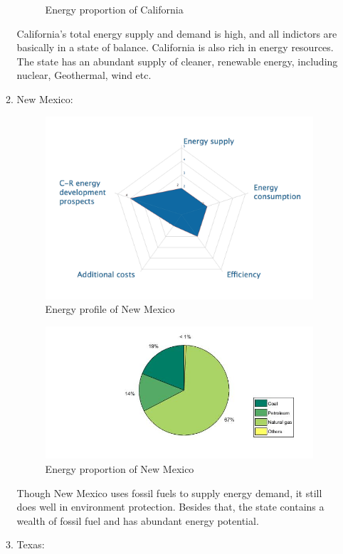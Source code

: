 \documentclass{mcmthesis}
\begin{document}
\begin{enumerate}
\begin{enumerate}
\begin{figure}[ht]
    \caption{Energy proportion of California}
    \end{figure}
     California’s total energy supply and demand is high, and all indictors are basically in a state of balance. California is also rich in energy resources. The state has an abundant supply of cleaner, renewable energy, including nuclear, Geothermal, wind etc.
    \item New Mexico:
    \begin{figure}[ht]
    \centering
    \includegraphics[scale=0.6]{NM.png}
    \caption{Energy profile of New Mexico}
    \end{figure}
    \begin{figure}[ht]
    \centering
    \includegraphics[scale=0.6]{NM1.jpg}
    \caption{Energy proportion of New Mexico}
    \end{figure}
     Though New Mexico uses fossil fuels to supply energy demand, it still does well in environment protection. Besides that, the state contains a wealth of fossil fuel and has abundant energy potential.
    \item Texas:


\end{enumerate}
\end{enumerate}
\end{document}

